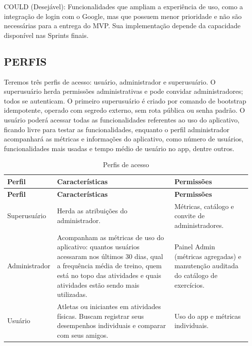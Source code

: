 COULD (Desejável): Funcionalidades que ampliam a experiência de uso, como a integração de login com o Google, mas que possuem menor prioridade e não são necessárias para a entrega do MVP. Sua implementação depende da capacidade disponível nas Sprints finais.

\subsection{PERFIS}

Teremos três perfis de acesso: usuário, administrador e superusuário. O superusuário herda permissões administrativas e pode convidar administradores; todos se autenticam. O primeiro superusuário é criado por comando de bootstrap idempotente, operado com segredo externo, sem rota pública ou senha padrão. O usuário poderá acessar todas as funcionalidades referentes ao uso do aplicativo, ficando livre para testar as funcionalidades, enquanto o perfil administrador acompanhará as métricas e informações do aplicativo, como número de usuários, funcionalidades mais usadas e tempo médio de usuário no app, dentre outros.

\begingroup
\small
\setlength{\tabcolsep}{4pt}
\renewcommand{\arraystretch}{1.2}
\begin{longtable}{|>{\raggedright\arraybackslash}p{}|>{\raggedright\arraybackslash}p{}|>{\raggedright\arraybackslash}p{}|}
\caption{Perfis de acesso}\\
\hline
\textbf{Perfil} & \textbf{Características} & \textbf{Permissões} \\ \hline
\endfirsthead
\textbf{Perfil} & \textbf{Características} & \textbf{Permissões} \\ \hline
\endhead
Superusuário & Herda as atribuições do administrador. & Métricas, catálogo e convite de administradores. \\ \hline
Administrador & Acompanham as métricas de uso do aplicativo: quantos usuários acessaram nos últimos 30 dias, qual a frequência média de treino, quem está no topo das atividades e quais atividades estão sendo mais utilizadas. & Painel Admin (métricas agregadas) e manutenção auditada do catálogo de exercícios. \\ \hline
Usuário & Atletas ou iniciantes em atividades físicas. Buscam registrar seus desempenhos individuais e comparar com seus amigos. & Uso do app e métricas individuais. \\ \hline
\end{longtable}
\endgroup

